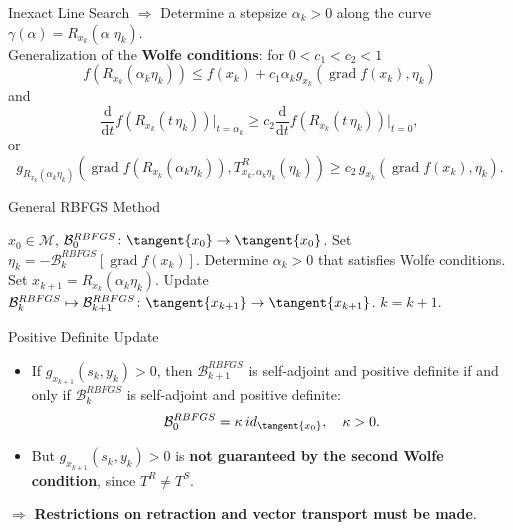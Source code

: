 \documentclass[9.4pt]{beamer}
\begin{document}
\begin{frame}{Inexact Line Search}
    $\Rightarrow$ Determine a stepsize $\alpha_k > 0$ along the curve $\gamma(\alpha) = R_{x_k}(\alpha \; \eta_k)$. \\[0.3\baselineskip]
    Generalization of the \textbf{Wolfe conditions}: for $0 < c_1 < c_2 < 1$
    \begin{equation*}
        f( R_{x_k}(\alpha_k \eta_k)) \leq f(x_k) + c_1 \alpha_k g_{x_k} (\operatorname{grad} f(x_k), \eta_k)
    \end{equation*}
    and 
    \begin{equation*}
        \frac{\mathrm{d}}{\mathrm{d}t} f(R_{x_k}(t \, \eta_k)) \vert_{t=\alpha_k} \geq c_2 \frac{\mathrm{d}}{\mathrm{d}t} f(R_{x_k}(t \, \eta_k)) \vert_{t=0},
    \end{equation*}
    or 
    \begin{equation*}
        g_{R_{x_k}(\alpha_k \eta_k)} (\operatorname{grad} f(R_{x_k}(\alpha_k \eta_k)),  T^{R}_{x_k, \alpha_k \eta_k}(\eta_k)) \geq c_2 \, g_{x_k} (\operatorname{grad} f(x_k), \eta_k).
    \end{equation*}
\end{frame}

\begin{frame}{General RBFGS Method}
    \begin{algorithm}[H]
        \begin{algorithmic}[1]
            \State $x_0 \in \mathcal{M}$, $\mathcal{B}^{RBFGS}_0 \colon \tangent{x_0} \to \tangent{x_0}$.
            \State Set $\eta_k = - \mathcal{B}^{RBFGS}_k [\operatorname{grad} f(x_k)]$.
            \State Determine $\alpha_k > 0$ that satisfies Wolfe conditions. 
            \State Set $x_{k+1} = R_{x_k}(\alpha_k \eta_k)$.
            \State Update $\mathcal{B}^{RBFGS}_k \mapsto \mathcal{B}^{RBFGS}_{k+1} \colon \tangent{x_{k+1}} \to \tangent{x_{k+1}}$. 
            \State $k = k+1$.
        \EndWhile
        \end{algorithmic}
    \end{algorithm}
\end{frame}

\begin{frame}{Positive Definite Update}
    \begin{itemize}
        \item If $g_{x_{k+1}}(s_k, y_k) > 0$, then $\mathcal{B}^{RBFGS}_{k+1}$ is self-adjoint and positive definite if and only if $\mathcal{B}^{RBFGS}_k$ is self-adjoint and positive definite: \begin{equation*}\mathcal{B}^{RBFGS}_0 = \kappa \, id_{\tangent{x_0}}, \quad \kappa > 0.\end{equation*}
        \item But $g_{x_{k+1}}(s_k, y_k) > 0$ is \textbf{not guaranteed by the second Wolfe condition}, since $T^R \neq T^S$.
    \end{itemize}
    \vspace{9.5pt}
    $\Rightarrow$ \textbf{Restrictions on retraction and vector transport must be made}.
\end{frame}
\end{document}
